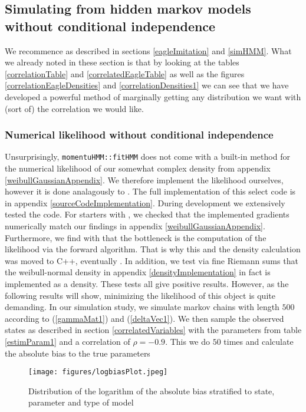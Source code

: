 \subsection{Simulating from hidden markov models without conditional independence}
We recommence as described in sections \ref{eagleImitation} and \ref{simHMM}. What we already noted in these section is that by looking at the tables \ref{correlationTable} and \ref{correlatedEagleTable} as well as the figures
\ref{correlationEagleDensities} and \ref{correlationDensities1} we can see that we have developed a powerful method of marginally getting any distribution we want with (sort of) the correlation we would like.
\subsubsection{Numerical likelihood without conditional independence}\label{numericalLikelihoodNoIndepende}
Unsurprisingly, \texttt{momentuHMM::fitHMM} does not come with a built-in method for the numerical likelihood of our somewhat complex density from appendix \ref{weibullGaussianAppendix}. We therefore implement the likelihood ourselves, however it is done analagously to \cite{momentuHMM}. The full implementation of this select code is in appendix \ref{sourceCodeImplementation}. During development we extensively tested the code. For starters with \cite{numDeriv}, we checked that the implemented gradients numerically match our findings in appendix \ref{weibullGaussianAppendix}. Furthermore, we find with \cite{profvis} that the bottleneck is the computation of the likelihood via the forward algorithm. That is why this and the density calculation was moved to C++, eventually \cite{Rcpp}. In addition, we test via fine Riemann sums that the weibull-normal density in appendix \ref{densityImplementation} in fact is implemented as a density. These tests all give positive results. However, as the following results will show, minimizing the likelihood of this object is quite demanding. In our simulation study, we simulate markov chains with length $500$ according to (\ref{gammaMat1}) and (\ref{deltaVec1}). We then sample the observed states as described in section \ref{correlatedVariables} with the parameters from table \ref{estimParam1} and a correlation of $\rho = -0.9$. This we do $50$ times and calculate the absolute bias to the true parameters
\begin{figure}[h]
  \centering
  \texttt{[image: figures/logbiasPlot.jpeg]}
  \caption{Distribution of the logarithm of the absolute bias stratified to state, parameter and type of model}
\end{figure}\\
